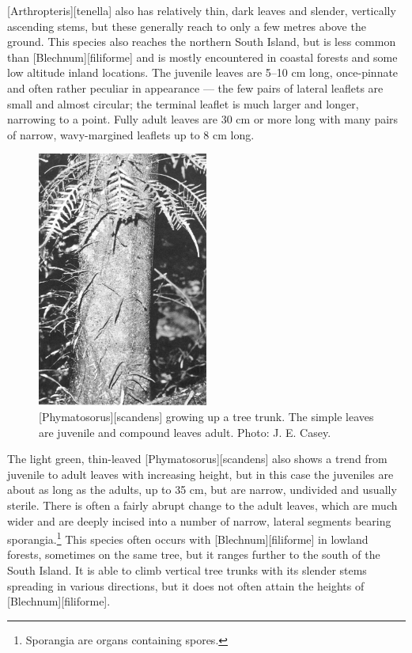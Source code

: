 [Arthropteris][tenella] also has relatively thin, dark leaves and slender, vertically ascending stems, but these generally reach to only a few metres above the ground.
This species also reaches the northern South Island, but is less common than [Blechnum][filiforme] and is mostly encountered in coastal forests and some low altitude inland locations.
The juvenile leaves are 5--10 cm long, once-pinnate and often rather peculiar in appearance --- the few pairs of lateral leaflets are small and almost circular; the terminal leaflet is much larger and longer, narrowing to a point.
Fully adult leaves are 30 cm or more long with many pairs of narrow, wavy-margined leaflets up to 8 cm long.

\begin{figure}
	\includegraphics[width=0.5\textwidth]{graphics/figure29scandens.jpg}
	\centering
	\caption[\emph{Phymatosorus scandens} growing up a tree trunk]{[Phymatosorus][scandens] growing up a tree trunk.
The simple leaves are juvenile and compound leaves adult.
	Photo: J. E. Casey.}%
	\label{fig:29scandens}
\end{figure}

The light green, thin-leaved [Phymatosorus][scandens] also shows a trend from juvenile to adult leaves with increasing height, but in this case the juveniles are about as long as the adults, up to 35 cm, but are narrow, undivided and usually sterile.
There is often a fairly abrupt change to the adult leaves, which are much wider and are deeply incised into a number of narrow, lateral segments bearing sporangia.\footnote{Sporangia are organs containing spores.}
This species often occurs with [Blechnum][filiforme] in lowland forests, sometimes on the same tree, but it ranges further to the south of the South Island.
It is able to climb vertical tree trunks with its slender stems spreading in various directions, but it does not often attain the heights of [Blechnum][filiforme].

